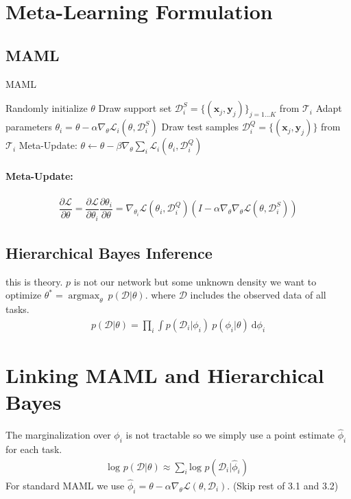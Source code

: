 \documentclass{article}
\DeclareMathOperator*{\argmax}{argmax}
\begin{document}
	\section{Meta-Learning Formulation}
	
	\subsection{MAML}
\begin{algorithm}
	\caption{MAML}
	\begin{algorithmic}  
		\STATE Randomly initialize $\theta$
			\STATE Draw support set $\mathcal{D}_i^{S} = \{ (\boldsymbol{x}_j, \boldsymbol{y}_j)\}_{j=1...K}$ from $\mathcal{T}_i$
			\STATE Adapt parameters $\theta_i = \theta - \alpha \nabla_{\theta} \mathcal{L}_i(\theta, \mathcal{D}_i^{S}) $
			\STATE Draw test samples  $\mathcal{D}_i^{Q} = \{(\boldsymbol{x}_j, \boldsymbol{y}_j)\}$ from $\mathcal{T}_i$
		\ENDFOR
		\STATE Meta-Update: $\theta \leftarrow \theta - \beta \nabla_{\theta} \sum_{i} \mathcal{L}_i(\theta_i, \mathcal{D}_{i}^{Q})$
		\ENDWHILE
	\end{algorithmic}
	\paragraph{Meta-Update:}
	\begin{align*}
		\dfrac{ \partial \mathcal{L}}{\partial \theta} = \dfrac{\partial \mathcal{L}}{\partial \theta_i} \dfrac{ \partial \theta_i}{\partial \theta} = \nabla_{\theta_i} \mathcal{L}(\theta_i, \mathcal{D}_i^{Q}) (I - \alpha \nabla_{\theta} \nabla_{\theta} \mathcal{L}(\theta, \mathcal{D}_i^S))
	\end{align*}
\end{algorithm}
	
	\subsection{Hierarchical Bayes Inference}
	this is theory. $p$ is not our network but some unknown density we want to optimize $\theta^* = \argmax_{\theta} \: p(\mathcal{D} \vert \theta)$. where $\mathcal{D}$ includes the observed data of all tasks.
	\begin{align}
		p(\mathcal{D} \vert \theta) = \prod_{i} \int p(\mathcal{D}_i \vert \phi_i) \: p(\phi_i \vert \theta) \: \text{d} \phi_i
	\end{align}

	\section{Linking MAML and Hierarchical Bayes}
	The marginalization over $\phi_i$ is not tractable so we simply use a point estimate $\hat{\phi}_i$ for each task.
	\begin{align}
		\text{log } p(\mathcal{D} \vert \theta) \approx \sum_{i} \text{log } p(\mathcal{D}_i \vert \hat{\phi}_i)
	\end{align}
	For standard MAML we use $\hat{\phi}_i = \theta - \alpha \nabla_{\theta} \mathcal{L}(\theta, \mathcal{D}_i)$. 
	(Skip rest of 3.1 and 3.2)
	
\end{document}
